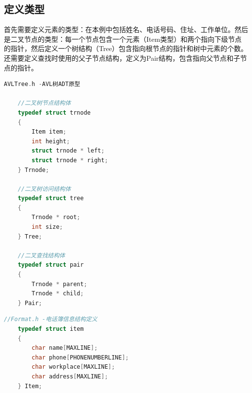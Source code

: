 \documentclass[12pt, a4paper, oneside]{ctexart}
\begin{document}
\subsection{定义类型}
首先需要定义元素的类型：在本例中包括姓名、电话号码、住址、工作单位。然后是二叉节点的类型：每一个节点包含一个元素（Item类型）和两个指向下级节点的指针，然后定义一个树结构（Tree）包含指向根节点的指针和树中元素的个数。还需要定义查找时使用的父子节点结构，定义为Pair结构，包含指向父节点和子节点的指针。
\begin{framed}
\begin{lstlisting}[language=C++]
    AVLTree.h -AVL树ADT原型

    //二叉树节点结构体
    typedef struct trnode
    {
        Item item;
        int height;
        struct trnode * left;
        struct trnode * right;
    } Trnode;

    //二叉树访问结构体
    typedef struct tree
    {
        Trnode * root;
        int size;
    } Tree;

    //二叉查找结构体
    typedef struct pair
    {
        Trnode * parent;
        Trnode * child;
    } Pair;
\end{lstlisting}
\end{framed}
\begin{framed}
\begin{lstlisting}[language=C++]
    //Format.h -电话簿信息结构定义
    typedef struct item
    {
        char name[MAXLINE];
        char phone[PHONENUMBERLINE];
        char workplace[MAXLINE];
        char address[MAXLINE];
    } Item;
\end{lstlisting}
\end{framed}
\end{document}
